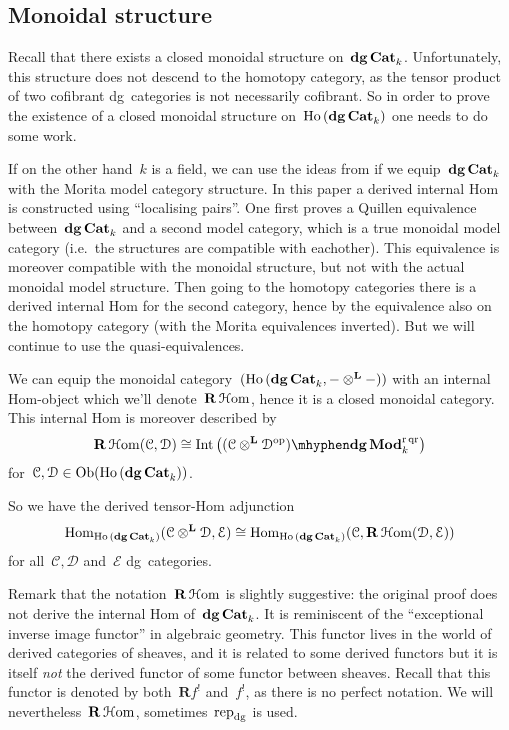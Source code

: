 \begin{refsection}
\section{Monoidal structure}
Recall that there exists a closed monoidal structure on~$\mathbf{dg\,Cat}_k$. Unfortunately, this structure does not descend to the homotopy category, as the tensor product of two cofibrant dg~categories is not necessarily cofibrant. So in order to prove the existence of a closed monoidal structure on~$\operatorname{\mathrm{Ho} \,}(\mathbf{dg\,Cat}_k)$ one needs to do some work.

If on the other hand~$k$ is a field, we can use the ideas from \cite{tabuada-3} if we equip~$\mathbf{dg\,Cat}_k$ with the Morita model category structure. In this paper a derived internal Hom is constructed using ``localising pairs''. One first proves a Quillen equivalence between~$\mathbf{dg\,Cat}_k$ and a second model category, which is a true monoidal model category (i.e.\ the structures are compatible with eachother). This equivalence is moreover compatible with the monoidal structure, but not with the actual monoidal model structure. Then going to the homotopy categories there is a derived internal Hom for the second category, hence by the equivalence also on the homotopy category (with the Morita equivalences inverted). But we will continue to use the quasi-equivalences.
\begin{theorem}
  \label{theorem:internal-Hom}
  We can equip the monoidal category~$(\operatorname{\mathrm{Ho} \,}(\mathbf{dg\,Cat}_k,-\otimes^{\mathbf{L}}-))$ with an internal Hom-object which we'll denote~$\mathbf{R}\operatorname{\mathcal{H}om}$, hence it is a closed monoidal category. This internal Hom is moreover described by
  \begin{equation}
    \RRRHHom(\mathcal{C},\mathcal{D})\cong\Int\left( \dgMod{(\mathcal{C}\LLLotimes\mathcal{D}^\opp)}_k^\rqr \right)
  \end{equation}
  for~$\mathcal{C},\mathcal{D}\in\operatorname{Ob}(\operatorname{\mathrm{Ho} \,}(\mathbf{dg\,Cat}_k))$.
\end{theorem}
So we have the derived tensor-Hom adjunction
\begin{equation}
  \label{equation:tensor-Hom-adjunction}
  \mathrm{Hom}_{\operatorname{\mathrm{Ho} \,}(\mathbf{dg\,Cat}_k)}(\mathcal{C}\otimes^{\mathbf{L}}\mathcal{D},\mathcal{E})\cong\mathrm{Hom}_{\operatorname{\mathrm{Ho} \,}(\mathbf{dg\,Cat}_k)}(\mathcal{C},\mathbf{R}\operatorname{\mathcal{H}om}(\mathcal{D},\mathcal{E}))
\end{equation}
for all~$\mathcal{C},\mathcal{D}$ and~$\mathcal{E}$ dg~categories.

Remark that the notation~$\mathbf{R}\operatorname{\mathcal{H}om}$ is slightly suggestive: the original proof does not derive the internal Hom of~$\mathbf{dg\,Cat}_k$. It is reminiscent of the ``exceptional inverse image functor'' in algebraic geometry. This functor lives in the world of derived categories of sheaves, and it is related to some derived functors but it is itself \emph{not} the derived functor of some functor between sheaves. Recall that this functor is denoted by both~$\mathbf{R}f^!$ and~$f^!$, as there is no perfect notation. We will nevertheless~$\mathbf{R}\operatorname{\mathcal{H}om}$, sometimes~$\mathrm{rep}_{\mathrm{dg}}$ is used.


\end{refsection}
